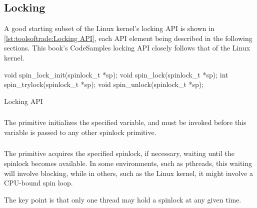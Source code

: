 \QuickQuizEnd

\subsection{Locking}
\label{sec:toolsoftrade:Locking}

A good starting subset of the Linux kernel's locking API is shown in
\cref{lst:toolsoftrade:Locking API},
each API element being described in the following sections.
This book's CodeSamples locking API closely follows that of the Linux kernel.

\begin{listing}
\begin{VerbatimL}[numbers=none]
void spin_lock_init(spinlock_t *sp);
void spin_lock(spinlock_t *sp);
int spin_trylock(spinlock_t *sp);
void spin_unlock(spinlock_t *sp);
\end{VerbatimL}
\caption{Locking API}
\label{lst:toolsoftrade:Locking API}
\end{listing}

\subsubsection{}

The  primitive initializes the specified
 variable, and must be invoked before
this variable is passed to any other spinlock primitive.

\subsubsection{}

The  primitive acquires the specified spinlock,
if necessary, waiting until the spinlock becomes available.
In some environments, such as pthreads, this waiting will involve
blocking, while in others, such as the Linux kernel, it might involve
a CPU-bound spin loop.

The key point is that only one thread may hold a spinlock at any
given time.

\subsubsection{}

